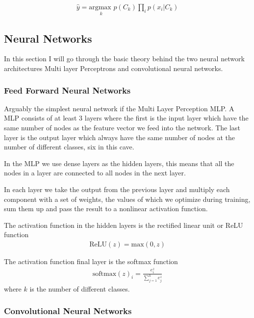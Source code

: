 \begin{align}
\hat{y} = \underset{k}{\text{argmax  }} p(C_k) \prod_i p(x_i|C_k)
\end{align}

\subsection{Neural Networks}
In this section I will go through the basic theory behind the two neural network architectures Multi layer Perceptrons and convolutional neural networks.


\subsubsection{Feed Forward Neural Networks}
Arguably the simplest neural network if the Multi Layer Perception MLP. A MLP consists of at least 3 layers where the first is the input layer which have the same number of nodes as the feature vector we feed into the network. The last layer is the output layer which always have the same number of nodes at the number of different classes, six in this cave.

In the MLP we use dense layers as the hidden layers, this means that all the nodes in a layer are connected to all nodes in the next layer.

In each layer we take the output from the previous layer and multiply each component with a set of weights, the values of which we optimize during training, sum them up and pass the result to a nonlinear activation function.

The activation function in the hidden layers is the rectified linear unit or ReLU function
\begin{align}
  \text{ReLU}(z)= \text{max}(0,z)
\end{align}

The activation function final layer is the softmax function
\begin{align}
  \text{softmax}(z)_i= \frac{e^z_i}{\sum_{j=1}^k e^z_j}
\end{align}
where $k$ is the number of different classes.

\subsubsection{Convolutional Neural Networks}

